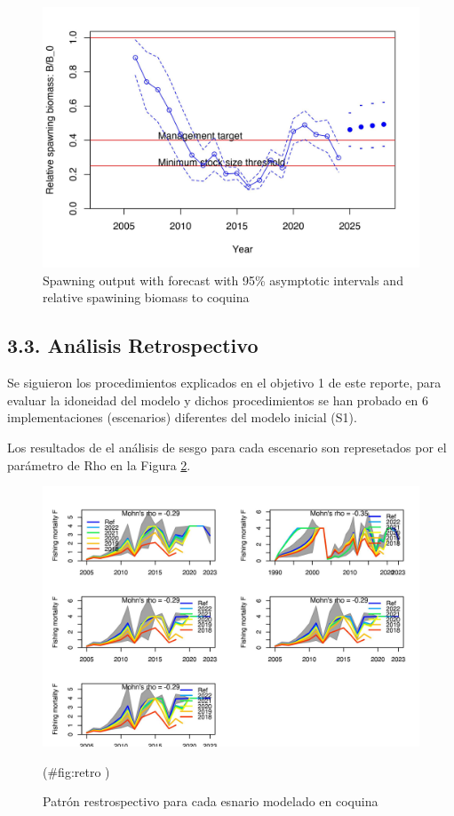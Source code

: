 \documentclass[
]{article}
\begin{document}
\begin{figure}[H]

{\centering \includegraphics[width=0.8\linewidth]{Dtrunculus_SS3_2024_files/figure-latex/ssb1-1} 

}

\caption{\label{fig:ssb1}Spawning output with forecast with 95\% asymptotic intervals and relative spawining biomass to coquina}\label{fig:ssb1}
\end{figure}

\hypertarget{anuxe1lisis-retrospectivo}{%
\subsection{3.3. Análisis Retrospectivo}\label{anuxe1lisis-retrospectivo}}

Se siguieron los procedimientos explicados en el objetivo 1 de este reporte, para evaluar la idoneidad
del modelo y dichos procedimientos se han probado en 6 implementaciones (escenarios) diferentes del
modelo inicial (S1).

Los resultados de el análisis de sesgo para cada escenario son represetados por el parámetro de Rho en la Figura \ref{fig:retro}.

\begin{figure}[H]

{\centering \includegraphics{Dtrunculus_SS3_2024_files/figure-latex/retro -1} 

}

\caption{\label{fig:retro}Patrón restrospectivo para cada esnario modelado en coquina}(\#fig:retro )
\end{figure}
\end{document}
